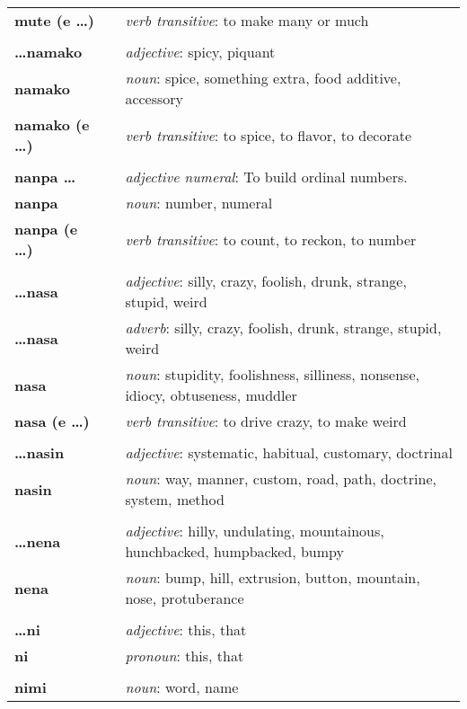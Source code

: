 \begin{supertabular}{p{2,5cm}|ll}
\textbf{mute (e \dots)} && \textit{verb transitive}: to make many or much \\ 
 && \\ %
\textbf{\dots namako} && \textit{adjective}: spicy, piquant \\ 
\textbf{namako} && \textit{noun}: spice, something extra, food additive, accessory \\ 
\textbf{namako (e \dots)} && \textit{verb transitive}: to spice, to flavor, to decorate \\ 
 && \\ %
\textbf{nanpa \dots} && \textit{adjective numeral}: To build ordinal numbers. \\ 
\textbf{nanpa} && \textit{noun}: number, numeral \\ 
\textbf{nanpa (e \dots)} && \textit{verb transitive}: to count, to reckon,  to number \\ 
 && \\ %
\textbf{\dots nasa} && \textit{adjective}: silly, crazy, foolish, drunk, strange, stupid, weird \\ 
\textbf{\dots nasa} && \textit{adverb}: silly, crazy, foolish, drunk, strange, stupid, weird \\ 
\textbf{nasa} && \textit{noun}: stupidity, foolishness, silliness, nonsense, idiocy, obtuseness, muddler \\ 
\textbf{nasa (e \dots)} && \textit{verb transitive}: to drive crazy, to make weird \\ 
 && \\ %
\textbf{\dots nasin} && \textit{adjective}: systematic, habitual, customary, doctrinal \\ 
\textbf{nasin} && \textit{noun}: way, manner, custom, road, path, doctrine, system, method \\ 
 && \\ %
\textbf{\dots nena} && \textit{adjective}: hilly, undulating, mountainous, hunchbacked, humpbacked, bumpy \\ 
\textbf{nena} && \textit{noun}: bump, hill, extrusion, button, mountain, nose, protuberance \\ 
 && \\ %
\textbf{\dots ni} && \textit{adjective}: this, that \\ 
\textbf{ni} && \textit{pronoun}: this, that \\ 
 && \\ %
\textbf{nimi} && \textit{noun}: word, name \\ 

\end{supertabular}
